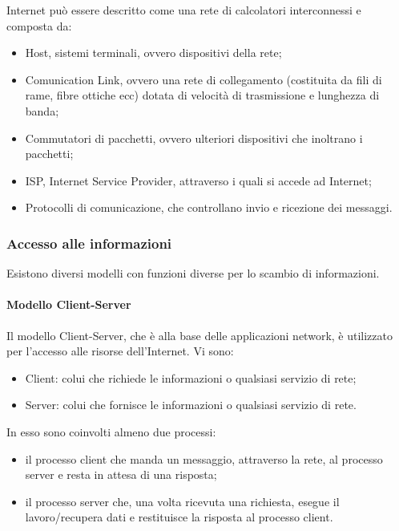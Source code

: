 \documentclass{subfiles}
\begin{document}
    Internet può essere descritto come una rete di calcolatori interconnessi e composta da:
    \begin{itemize}
        \item Host, sistemi terminali, ovvero dispositivi della rete;
        \item Comunication Link, ovvero una rete di collegamento (costituita da fili di rame, fibre ottiche ecc) 
        dotata di velocità di trasmissione e lunghezza di banda;
        \item Commutatori di pacchetti, ovvero ulteriori dispositivi che inoltrano i pacchetti;
        \item ISP, Internet Service Provider, attraverso i quali si accede ad Internet;
        \item Protocolli di comunicazione, che controllano invio e ricezione dei messaggi.
    \end{itemize}
    
\subsubsection{Accesso alle informazioni}
    Esistono diversi modelli con funzioni diverse per lo scambio di informazioni.
    
    \paragraph{Modello Client-Server}
    Il modello Client-Server, che è alla base delle applicazioni network, è utilizzato 
    per l'accesso alle risorse dell'Internet.
    Vi sono:
    \begin{itemize}
        \item Client: colui che richiede le informazioni o qualsiasi servizio di rete;
        \item Server: colui che fornisce le informazioni o qualsiasi servizio di rete.
    \end{itemize}
    In esso sono coinvolti almeno due processi:
    \begin{itemize}
        \item il processo client che manda un messaggio, attraverso la rete, al processo server e resta in attesa di una risposta;
        \item il processo server che, una volta ricevuta una richiesta, esegue il lavoro/recupera dati e restituisce la risposta 
        al processo client.
    \end{itemize}
\end{document}
